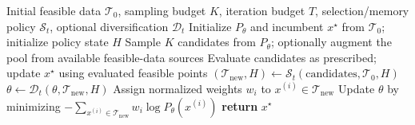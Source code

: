 \begin{algorithm}
\caption{Generative optimization with a tensor train}
\label{alg:tt_generative}
\begin{algorithmic}[1]
\REQUIRE Initial feasible data $\mathcal T_0$, sampling budget $K$, iteration budget $T$, selection/memory policy $\mathcal S_t$, optional diversification $\mathcal D_t$
\STATE Initialize $P_\theta$ and incumbent $x^\star$ from $\mathcal T_0$; initialize policy state $H$
    \STATE Sample $K$ candidates from $P_\theta$; optionally augment the pool from available feasible-data sources
    \STATE Evaluate candidates as prescribed; update $x^\star$ using evaluated feasible points
    \STATE $(\mathcal T_{\mathrm{new}},H)\gets\mathcal S_t(\text{candidates},\mathcal T_0,H)$
    \STATE $\theta\gets\mathcal D_t(\theta,\mathcal T_{\mathrm{new}},H)$ 
    \STATE Assign normalized weights $w_i$ to $x^{(i)}\in\mathcal T_{\mathrm{new}}$
    \STATE Update $\theta$ by minimizing $\displaystyle -\sum_{x^{(i)}\in\mathcal T_{\mathrm{new}}}w_i\log P_\theta(x^{(i)})$
\ENDFOR
\STATE \textbf{return} $x^\star$
\end{algorithmic}
\end{algorithm}

